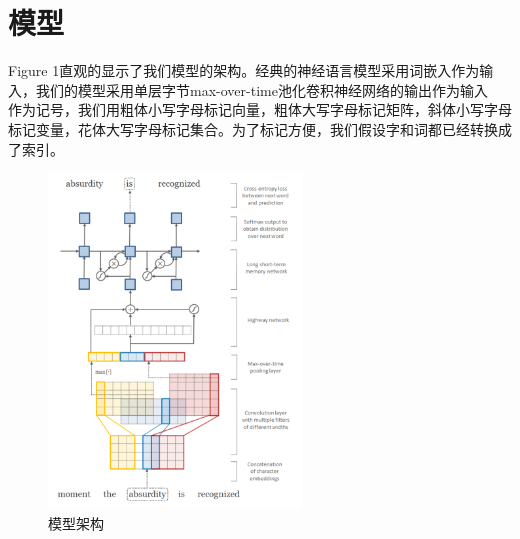 \section{模型}
Figure 1直观的显示了我们模型的架构。经典的神经语言模型采用词嵌入作为输入，我们的模型采用单层字节max-over-time池化卷积神经网络的输出作为输入\\
作为记号，我们用粗体小写字母标记向量，粗体大写字母标记矩阵，斜体小写字母标记变量，花体大写字母标记集合。为了标记方便，我们假设字和词都已经转换成了索引。\\
\begin{figure}[h]
  \centering
  \includegraphics[width=0.6\textwidth]{./images/figure1}
  \caption{模型架构}
\end{figure}
